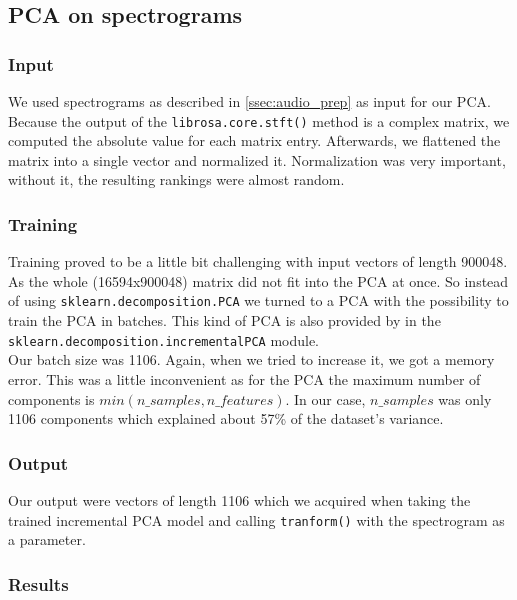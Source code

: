 \subsection {PCA on spectrograms}

\subsubsection{Input}
We used spectrograms as described in \ref{ssec:audio_prep} as input for our PCA. Because the output of the \texttt{librosa.core.stft()} method is a complex matrix, we computed the absolute value for each matrix entry. Afterwards, we flattened the matrix into a single vector and normalized it. Normalization was very important, without it, the resulting rankings were almost random.

\subsubsection{Training}
Training proved to be a little bit challenging with input vectors of length 900048. As the whole (16594x900048) matrix did not fit into the PCA at once. So instead of using \texttt{sklearn.decomposition.PCA} we turned to a PCA with the possibility to train the PCA in batches. This kind of PCA is also provided by  in the \texttt{sklearn.decomposition.incrementalPCA} module. \\ Our batch size was 1106. Again, when we tried to increase it, we got a memory error. This was a little inconvenient as for the PCA the maximum number of components is $min(n\_samples, n\_features)$. In our case, $n\_samples$ was only 1106 components which explained about 57\% of the dataset's variance.

\subsubsection{Output}
Our output were vectors of length 1106 which we acquired when taking the trained incremental PCA model and calling \texttt{tranform()} with the spectrogram as a parameter.

\subsubsection{Results}

